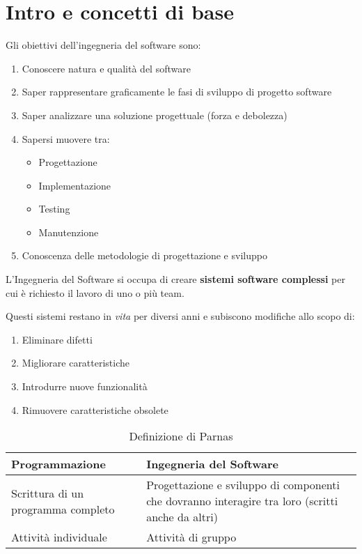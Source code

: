 \chapter{Intro e concetti di base}

Gli obiettivi dell'ingegneria del software sono:
\begin{enumerate}
    \item Conoscere natura e qualità del software
    \item Saper rappresentare graficamente le fasi di sviluppo di progetto software
    \item Saper analizzare una soluzione progettuale (forza e debolezza)
    \item Sapersi muovere tra:
    \begin{itemize}
        \item Progettazione
        \item Implementazione
        \item Testing
        \item Manutenzione
    \end{itemize}
    \item Conoscenza delle metodologie di progettazione e sviluppo
\end{enumerate}

L'Ingegneria del Software si occupa di creare \textbf{sistemi software complessi} per cui è richiesto il lavoro di uno o più team.

Questi sistemi restano in \textit{vita} per diversi anni e subiscono modifiche allo scopo di:
\begin{enumerate}
    \item Eliminare difetti
    \item Migliorare caratteristiche
    \item Introdurre nuove funzionalità
    \item Rimuovere caratteristiche obsolete
\end{enumerate}

\begin{table}[H]
    \centering
    \begin{tabularx}{\textwidth}{|X|X|}
        \hline
        \textbf{Programmazione} & \textbf{Ingegneria del Software} \\
        \hline
        Scrittura di un programma completo & Progettazione e sviluppo di componenti che dovranno interagire tra loro (scritti anche da altri) \\
        \hline
        Attività individuale & Attività di gruppo \\
        \hline
    \end{tabularx}
    \caption{Definizione di Parnas}
\end{table}

